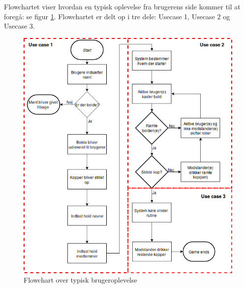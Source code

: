 \documentclass[Kravspecifikation/Kravspec_Main.tex]{subfiles}
\begin{document}
Flowchartet viser hvordan en typisk oplevelse fra brugerens side kommer til at foregå: se figur \ref{fig:flowchart}. Flowchartet er delt op i tre dele: Usecase 1, Usecase 2 og Usecase 3.   

\begin{figure}
    \centering
    \includegraphics[scale=0.5]{Kravspecifikation/Flowchart/pics/Beerpongflowchart.png}
    \caption{Flowchart over typisk brugeroplevelse}
    \label{fig:flowchart}
\end{figure}
\end{document}
